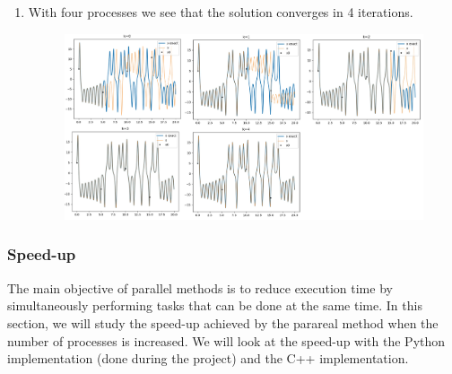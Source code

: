 \begin{enumerate}[label=\textbullet]
\begin{enumerate}[label=-]
		\newpage
		\item With four processes we see that the solution converges in 4 iterations.
		\begin{figure}[H]      
			\qquad \qquad
			\includegraphics[width=0.7\linewidth]{"images/parareal/cpp/lorenz_4p.jpg"}
			\label{lorenz:4}
		\end{figure}
	
	\end{enumerate}

\end{enumerate}

\subsubsection{Speed-up}
\label{speed_up}

The main objective of parallel methods is to reduce execution time by simultaneously performing tasks that can be done at the same time. In this section, we will study the speed-up achieved by the parareal method when the number of processes is increased. We will look at the speed-up with the Python implementation (done during the project) and the C++ implementation.

